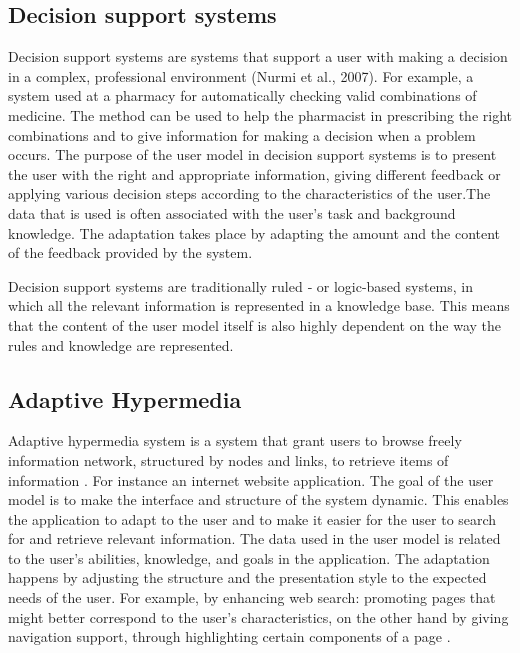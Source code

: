 \subsection{Decision support systems}

Decision support systems are systems that support a user with making a decision
in a complex, professional environment \cite{} (Nurmi et al., 2007). For example,  a
system used at a pharmacy for automatically checking valid combinations of
medicine. The method can be used to help the pharmacist in prescribing the right
combinations and to give information for making a decision when a problem
occurs.  The purpose of the user model in decision support systems is to present
the user with the right and appropriate information, giving different feedback
or applying various decision steps according to the characteristics of the
user.The data that is used is often associated with the user’s task and
background knowledge.    The adaptation takes place by adapting the amount and
the content of the feedback provided by the system.


Decision support systems are traditionally ruled ‐ or logic-based systems, in
which all the relevant information is represented in a knowledge base. This
means that the content of the user model itself is also highly dependent on the
way the rules and knowledge are represented.


\subsection{Adaptive Hypermedia}

Adaptive hypermedia system is a system that grant users to browse freely information
network,  structured by nodes and links, to retrieve items of information \cite{deepa2012adaptive}. For instance an internet website application.
The goal of the user model is to make the interface and structure of the system
dynamic. This enables the application to adapt to the user and to make it easier
for the user to search for and retrieve relevant information.  The data used in
the user model is related to the user’s abilities, knowledge, and goals in the
application. The adaptation happens by adjusting the structure and the
presentation style to the expected needs of the user. For example, by enhancing
web search: promoting pages that might better correspond to the user’s
characteristics, on the other hand by giving navigation support, through
highlighting certain components of a page \cite{razmerita2012user}.

